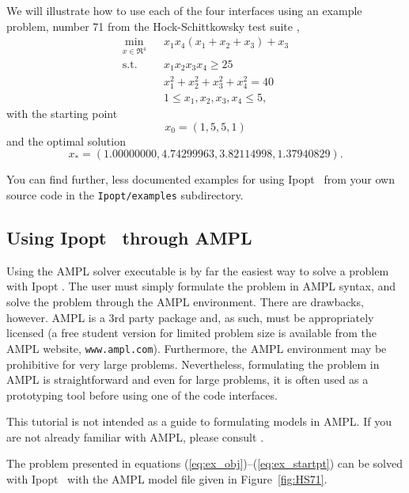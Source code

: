 \documentclass[10pt]{article}
\newcommand{\Ipopt}{{\sc Ipopt }}
\begin{document}
We will illustrate how to use each of the four interfaces using an
example problem, number 71 from the Hock-Schittkowsky test suite \cite{HS},
  \begin{eqnarray}
    \min_{x \in \Re^4} &&x_1 x_4 (x_1 + x_2 + x_3)  +  x_3 \label{eq:ex_obj} \\
    \mbox{s.t.}  &&x_1 x_2 x_3 x_4 \ge 25 \label{eq:ex_ineq} \\
    &&x_1^2 + x_2^2 + x_3^2 + x_4^2  =  40 \label{eq:ex_equ} \\
    &&1 \leq x_1, x_2, x_3, x_4 \leq 5, \label{eq:ex_bounds}
  \end{eqnarray}
with the starting point
\begin{equation}
x_0 = (1, 5, 5, 1) \label{eq:ex_startpt}
\end{equation}
and the optimal solution
\[
x_* = (1.00000000, 4.74299963, 3.82114998, 1.37940829). \nonumber
\]

You can find further, less documented examples for using \Ipopt\ from
your own source code in the {\tt Ipopt/examples} subdirectory.

\subsection{Using \Ipopt\ through AMPL}
Using the AMPL solver executable is by far the easiest way to
solve a problem with \Ipopt. The user must simply formulate the problem
in AMPL syntax, and solve the problem through the AMPL environment.
There are drawbacks, however. AMPL is a 3rd party package and, as
such, must be appropriately licensed (a free student version for
limited problem size is available from the AMPL website,
\texttt{www.ampl.com}). Furthermore, the AMPL environment may be prohibitive
for very large problems. Nevertheless, formulating the problem in AMPL
is straightforward and even for large problems, it is often used as a
prototyping tool before using one of the code interfaces.

This tutorial is not intended as a guide to formulating models in
AMPL. If you are not already familiar with AMPL, please consult
\cite{FouGayKer:AMPLbook}.

The problem presented in equations
(\ref{eq:ex_obj})--(\ref{eq:ex_startpt}) can be solved with \Ipopt\ with
the AMPL model file given in Figure~\ref{fig:HS71}.
\end{document}
